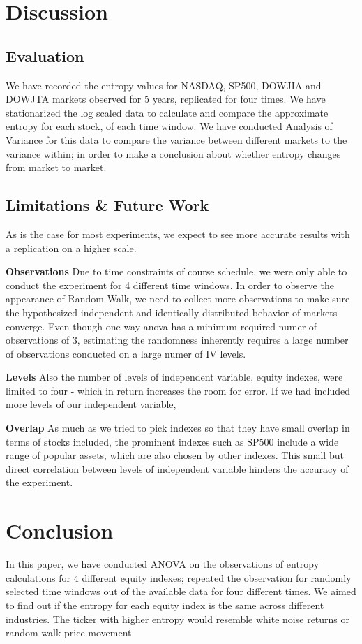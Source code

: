 \documentclass{article}[12pt]
\begin{document}
        \section{Discussion}
            \subsection{Evaluation}
                We have recorded the entropy values for NASDAQ, SP500, DOWJIA and DOWJTA markets observed for 5 years, replicated for four times. We have stationarized the log scaled data to calculate and compare the approximate entropy for each stock, of each time window. We have conducted Analysis of Variance for this data to compare the variance between different markets to the variance within; in order to make a conclusion about whether entropy changes from market to market. 
                

            \subsection{Limitations \& Future Work}
                As is the case for most experiments, we expect to see more accurate results with a replication on a higher scale.

                \textbf{Observations} Due to time constraints of course schedule, we were only able to conduct the experiment for 4 different time windows. In order to observe the appearance of Random Walk, we need to collect more observations to make sure the hypothesized independent and identically distributed behavior of markets converge. Even though one way anova has a minimum required numer of observations of 3, estimating the randomness inherently requires a large number of observations conducted on a large numer of IV levels.

                \textbf{Levels} Also the number of levels of independent variable, equity indexes, were limited to four - which in return increases the room for error. If we had included more levels of our independent variable,
                
                \textbf{Overlap} As much as we tried to pick indexes so that they have small overlap in terms of stocks included, the prominent indexes such as SP500 include a wide range of popular assets, which are also chosen by other indexes. This small but direct correlation between levels of independent variable hinders the accuracy of the experiment.

            \section{Conclusion}
                In this paper, we have conducted ANOVA on the observations of entropy calculations for 4 different equity indexes; repeated the observation for randomly selected time windows out of the available data for four different times. We aimed to find out if the entropy for each equity index is the same across different industries. The ticker with higher entropy would resemble white noise returns or random walk price movement.
\end{document}
